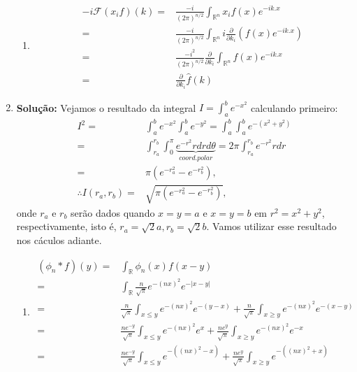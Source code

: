 \documentclass{article}
\begin{document}
\begin{enumerate}
\begin{enumerate}
				\item
				$$
				\begin{aligned}
				-i\mathcal{F}(x_{i}f)(k) = & \frac{-i}{(2\pi)^{n/2}}\int_{\mathbb{R}^{n}} x_{i}f(x)e^{-ik.x}
				\\
				= & \frac{-i}{(2\pi)^{n/2}}\int_{\mathbb{R}^{n}} i\frac{\partial}{\partial k_{i}}( f(x)e^{-ik.x} )
				\\
				= & \frac{-i^{2}}{(2\pi)^{n/2}} \frac{\partial}{\partial k_{i}}\int_{\mathbb{R}^{n}} f(x)e^{-ik.x}
				\\
				= & \frac{\partial}{\partial k_{i}}\hat{f}(k)
				\end{aligned}
				$$
			\end{enumerate}
		
		\item \textbf{Solução:} Vejamos o resultado da integral $I = \int_{a}^{b} e^{-x^{2}}$ calculando primeiro:
		$$
		\begin{aligned}
		I^{2} = & \int_{a}^{b} e^{-x^{2}}\int_{a}^{b} e^{-y^{2}} = \int_{a}^{b} \int_{a}^{b} e^{-(x^{2}+y^{2})} 
		\\
		= & \int_{r_{a}}^{r_{b}} \int_{0}^{\pi} \underbrace{ e^{-r^{2}}r dr d\theta }_{coord. polar} = 2\pi \int_{r_{a}}^{r_{b}} e^{-r^{2}}r dr
		\\
		= & \pi (e^{-r_{a}^{2}} - e^{-r_{b}^{2}}),
		\\
		\therefore I(r_{a}, r_{b}) = & \sqrt{\pi (e^{-r_{a}^{2}} - e^{-r_{b}^{2}})},
		\end{aligned}
		$$
		onde $r_{a}$ e $r_{b}$ serão dados quando $x=y=a$ e $x=y=b$ em  $r^{2} = x^{2}+y^{2}$, respectivamente, isto é, $r_{a} = \sqrt{2}a, r_{b} = \sqrt{2}b$. Vamos utilizar esse resultado nos cáculos adiante.
			\begin{enumerate}
				\item
					$$
					\begin{aligned}
					(\phi_{n}*f)(y) = &\int_{\mathbb{R}} \phi_{n}(x)f(x-y)
					\\
					= &\int_{\mathbb{R}} \frac{n}{\sqrt{\pi}}e^{-(nx)^{2}} e^{-|x-y|}
					\\
					= & \frac{n}{\sqrt{\pi}}\int_{x \leq y} e^{-(nx)^{2}} e^{-(y-x)} + \frac{n}{\sqrt{\pi}}\int_{x \geq y} e^{-(nx)^{2}} e^{-(x-y)}
					\\
					= & \frac{ne^{-y}}{\sqrt{\pi}}\int_{x \leq y} e^{-(nx)^{2}} e^{x} + \frac{ne^{y}}{\sqrt{\pi}}\int_{x \geq y} e^{-(nx)^{2}} e^{-x}
					\\
					= & \frac{ne^{-y}}{\sqrt{\pi}}\int_{x \leq y} e^{-((nx)^{2} -x)}  + \frac{ne^{y}}{\sqrt{\pi}}\int_{x \geq y} e^{-((nx)^{2}+x)}

\end{aligned}$$
\end{enumerate}
\end{enumerate}
\end{document}
